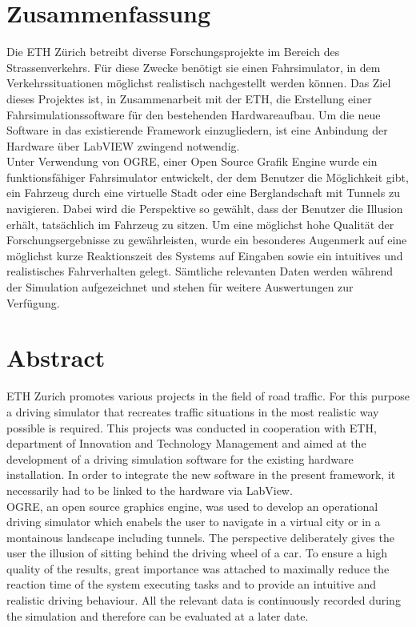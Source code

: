 \section*{Zusammenfassung}
Die ETH Zürich betreibt diverse Forschungsprojekte im Bereich des Strassenverkehrs. Für diese Zwecke benötigt sie einen Fahrsimulator, in dem Verkehrssituationen möglichst realistisch nachgestellt werden können. Das Ziel dieses Projektes ist, in Zusammenarbeit mit der ETH, die Erstellung einer Fahrsimulationssoftware für den bestehenden Hardwareaufbau. Um die neue Software in das existierende Framework einzugliedern, ist eine Anbindung der Hardware über LabVIEW zwingend notwendig.\\
Unter Verwendung von OGRE, einer Open Source Grafik Engine wurde ein funktionsfähiger Fahrsimulator entwickelt, der dem Benutzer die Möglichkeit gibt, ein Fahrzeug durch eine virtuelle Stadt oder eine Berglandschaft mit Tunnels zu navigieren. Dabei wird die Perspektive so gewählt, dass der Benutzer die Illusion erhält, tatsächlich im Fahrzeug zu sitzen.
Um eine möglichst hohe Qualität der Forschungsergebnisse zu gewährleisten, wurde ein besonderes Augenmerk auf eine möglichst kurze Reaktionszeit des Systems auf Eingaben sowie ein intuitives und realistisches Fahrverhalten gelegt.
Sämtliche relevanten Daten werden während der Simulation aufgezeichnet und stehen für weitere Auswertungen zur Verfügung.
\newpage
\thispagestyle{empty}
\hspace{1cm}
\newpage
\section*{Abstract}
ETH Zurich promotes various projects in the field of road traffic. For this purpose a driving simulator that recreates traffic situations in the most realistic way possible is required. This projects was conducted in cooperation with ETH, department of Innovation and Technology Management and aimed at the development of a driving simulation software for the existing hardware installation. In order to integrate the new software in the present framework, it necessarily had to be linked to the hardware via LabView. \\
OGRE, an open source graphics engine, was used to develop an operational driving simulator which enabels the user to navigate in a virtual city or in a montainous landscape including tunnels. The perspective deliberately gives the user the illusion of sitting behind the driving wheel of a car. To ensure a high quality of the results, great importance was attached to maximally reduce the reaction time of the system executing tasks and to provide an intuitive and realistic driving behaviour. All the relevant data is continuously recorded during the simulation and therefore can be evaluated at a later date.
\newpage
\thispagestyle{empty}
\hspace{1cm}
\newpage